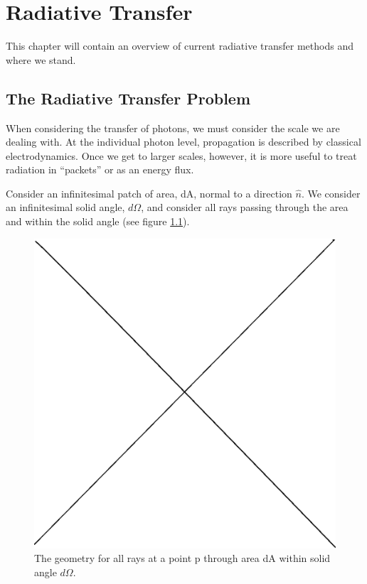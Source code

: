 \pagestyle{fancy}
\headheight 20pt
\chead{}
\lfoot{}
\cfoot{\thepage}
\rfoot{}
\renewcommand{\headrulewidth}{0.1pt}
\renewcommand{\footrulewidth}{0.1pt}

\chapter{Radiative Transfer}
\label{chap:radtransfer}

\thispagestyle{fancy}

This chapter will contain an overview of current radiative transfer methods and where we stand.

\section{The Radiative Transfer Problem}
\label{sec:rtformulation}

When considering the transfer of photons, we must consider the scale we are dealing with. At the individual photon level, propagation is described by classical electrodynamics. Once we get to larger scales, however, it is more useful to treat radiation in ``packets'' or as an energy flux.

Consider an infinitesimal patch of area, dA, normal to a direction $\hat{n}$. We consider an infinitesimal solid angle, $d\Omega$, and consider all rays passing through the area and within the solid angle (see figure \ref{fig:intensity}).

\begin{figure}
\label{fig:intensity}
\includegraphics[width=\textwidth]{graphics/placeholder.eps}
\caption{The geometry for all rays at a point p through area dA within solid angle $d\Omega$.}
\end{figure}

